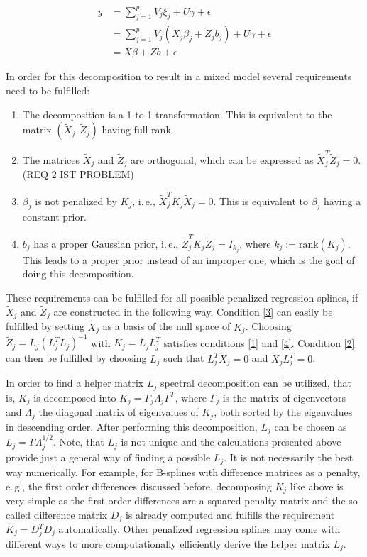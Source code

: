 \documentclass[12pt]{article}
\begin{document}
\begin{align}
y &= \sum_{j=1}^p V_j \xi_j + U\gamma + \epsilon\label{am}\\
 &= \sum_{j=1}^p V_j(\tilde{X}_j \beta_j + \tilde{Z}_j b_j) + U\gamma + \epsilon\label{einsetzen}\\
 &=   X\beta + Zb + \epsilon\label{mm}
\end{align}

In order for this decomposition to result in a mixed model several requirements need to be fulfilled:

\begin{enumerate}
\item The decomposition is a 1-to-1 transformation. This is equivalent to the matrix $(\tilde{X}_j \:\:  \tilde{Z}_j)$ having full rank. \label{1}
\item The matrices $\tilde{X}_j$ and $\tilde{Z}_j$ are orthogonal, which can be expressed as $\tilde{X}_j^T \tilde{Z}_j = 0$. (REQ 2 IST PROBLEM) \label{2}
\item $\beta_j$ is not penalized by $K_j$, i.\,e., $\tilde{X}_j^T K_j \tilde{X}_j = 0$. This is equivalent to $\beta_j$ having a constant prior. \label{3}
\item $b_j$ has a proper Gaussian prior, i.\,e., $\tilde{Z}_j^T K_j \tilde{Z}_j = I_{k_j}$, 
where $k_j := \text{rank}(K_j)$. This leads to a proper prior instead of an improper one, which is the goal of doing this decomposition. \label{4}
\end{enumerate}

These requirements can be fulfilled for all possible penalized regression splines, if $\tilde{X}_j$ and $\tilde{Z}_j$ are constructed in the following way. Condition \ref{3} can easily be fulfilled by setting $\tilde{X}_j$ as a basis of the null space of $K_j$. Choosing $\tilde{Z}_j =L_j (L_j^T L_j)^{-1}$ with $K_j =L_j L_j^T$ satisfies conditions \ref{1} and \ref{4}.  Condition \ref{2} can then be fulfilled by choosing $L_j$ such that $L_j^T\tilde{X}_j = 0$ and $\tilde{X}_jL_j^T = 0$.

 
In order to find a helper matrix $L_j$ spectral decomposition can be utilized, that is, $K_j$ is decomposed into $K_j = \Gamma_j \Lambda_j \Gamma^T$, where $\Gamma_j$ is the matrix of eigenvectors and $\Lambda_j$ the diagonal matrix of eigenvalues of $K_j$, both sorted by the eigenvalues in descending order. After performing this decomposition, $L_j$ can be chosen as $L_j = \Gamma \Lambda_j^{1/2}$. Note, that $L_j$ is not unique and the calculations presented above provide just a general way of finding a possible $L_j$. It is not necessarily the best way numerically. For example, for B-splines with difference matrices as a penalty, e.\,g., the first order differences discussed before, decomposing $K_j$ like above is very simple as the first order differences are a squared penalty matrix and the so called difference matrix $D_j$ is already computed and fulfills the requirement $K_j = D_j^TD_j$  automatically. Other penalized regression splines may come with different ways to more computationally efficiently derive the helper matrix $L_j$.
\end{document}
